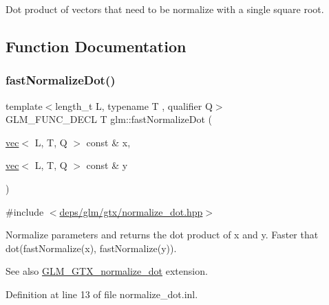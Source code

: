 Dot product of vectors that need to be normalize with a single square root. 

\subsection{Function Documentation}
\mbox{\label{group__gtx__normalize__dot_ga2746fb9b5bd22b06b2f7c8babba5de9e}} 
\subsubsection{\texorpdfstring{fast\+Normalize\+Dot()}{fastNormalizeDot()}}
{\footnotesize\ttfamily template$<$length\+\_\+t L, typename T , qualifier Q$>$ \\
G\+L\+M\+\_\+\+F\+U\+N\+C\+\_\+\+D\+E\+CL T glm\+::fast\+Normalize\+Dot (\begin{DoxyParamCaption}\item[{\hyperlink{structglm_1_1vec}{vec}$<$ L, T, Q $>$ const \&}]{x,  }\item[{\hyperlink{structglm_1_1vec}{vec}$<$ L, T, Q $>$ const \&}]{y }\end{DoxyParamCaption})}



{\ttfamily \#include $<$\hyperlink{normalize__dot_8hpp}{deps/glm/gtx/normalize\+\_\+dot.\+hpp}$>$}

Normalize parameters and returns the dot product of x and y. Faster that dot(fast\+Normalize(x), fast\+Normalize(y)).

\begin{DoxySeeAlso}{See also}
\hyperlink{group__gtx__normalize__dot}{G\+L\+M\+\_\+\+G\+T\+X\+\_\+normalize\+\_\+dot} extension. 
\end{DoxySeeAlso}


Definition at line 13 of file normalize\+\_\+dot.\+inl.

\mbox{\label{group__gtx__normalize__dot_gacb140a2b903115d318c8b0a2fb5a5daa}} 
